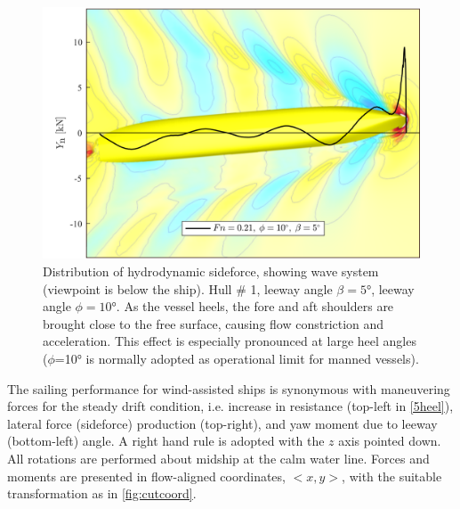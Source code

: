 \documentclass[twoside,twocolumn]{article}
\begin{document}
\begin{figure}[!h]
	\centering
	\includegraphics[width=.7\textwidth]{images/hull1.png}  %
	\caption{Distribution of hydrodynamic sideforce, showing wave system (viewpoint is below the ship).  Hull \# 1, leeway angle $\beta=\ang{5}$, leeway angle $\phi=\ang{10}$. As the vessel heels, the fore and aft shoulders are brought close to the free surface, causing flow constriction and acceleration. This effect is especially pronounced at large heel angles ($\phi$=\ang{10} is normally adopted as operational limit for manned vessels).}
	\label{fig:Ynphi}
\end{figure}


The sailing performance for wind-assisted ships is synonymous with maneuvering forces for the steady drift condition, i.e. increase in resistance (top-left in \cref{5heel}), lateral force (sideforce) production (top-right), and yaw moment due to leeway (bottom-left) angle. A right hand rule is adopted with the $z$ axis pointed down. All rotations are performed about midship at the calm water line. Forces and moments are presented in flow-aligned coordinates, $<x,y>$, with the suitable transformation as in \cref{fig:cutcoord}.
\end{document}
